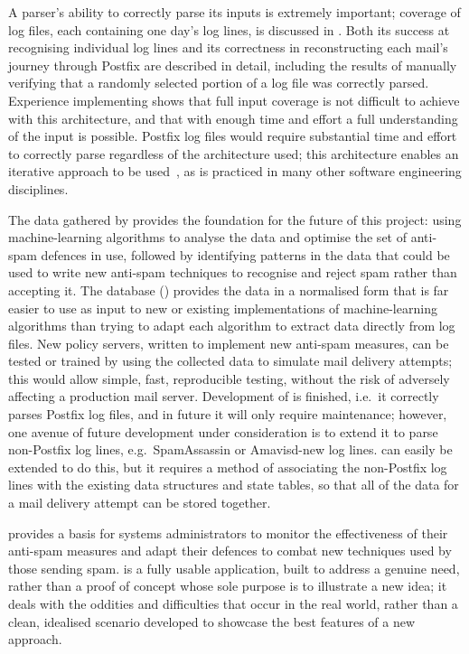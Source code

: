 A parser's ability to correctly parse its inputs is extremely important;
\parsernames{} coverage of \numberOFlogFILES{} log files, each containing
one day's log lines, is discussed in .  Both
its success at recognising individual log lines  and its correctness in
reconstructing each mail's journey through Postfix are described in detail,
including the results of manually verifying that a randomly selected
portion of a log file was correctly parsed.  Experience implementing
\parsername{} shows that full input coverage is not difficult to achieve
with this architecture, and that with enough time and effort a full
understanding of the input is possible.  Postfix log files would require
substantial time and effort to correctly parse regardless of the
architecture used; this architecture enables an iterative approach to be
used~\cite{stepwise-refinement}, as is practiced in many other software
engineering disciplines.

The data gathered by \parsername{} provides the foundation for the future
of this project: using machine-learning algorithms to analyse the data and
optimise the set of anti-spam defences in use, followed by identifying
patterns in the data that could be used to write new anti-spam techniques
to recognise and reject spam rather than accepting it.  The database
() provides the data in a normalised form that is far
easier to use as input to new or existing implementations of
machine-learning algorithms than trying to adapt each algorithm to extract
data directly from log files.  New policy servers, written to implement new
anti-spam measures, can be tested or trained by using the collected data to
simulate mail delivery attempts; this would allow simple, fast,
reproducible testing, without the risk of adversely affecting a production
mail server.  Development of \parsername{} is finished, i.e.\ it correctly
parses Postfix log files, and in future it will only require maintenance;
however, one avenue of future development under consideration is to extend
it to parse non-Postfix log lines, e.g.\ SpamAssassin or Amavisd-new log
lines.  \parsername{} can easily be extended to do this, but it requires a
method of associating the non-Postfix log lines with the existing data
structures and state tables, so that all of the data for a mail delivery
attempt can be stored together.

\parsername{} provides a basis for systems administrators to monitor the
effectiveness of their anti-spam measures and adapt their defences to
combat new techniques used by those sending spam.  \parsername{} is a fully
usable application, built to address a genuine need, rather than a proof of
concept whose sole purpose is to illustrate a new idea; it deals with the
oddities and difficulties that occur in the real world, rather than a
clean, idealised scenario developed to showcase the best features of a new
approach.

